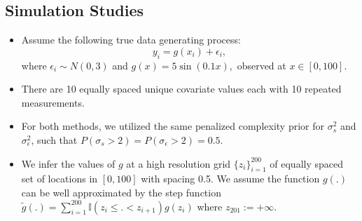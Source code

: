\documentclass{beamer} %
\begin{document}
\subsection{Simulation Studies}
\begin{frame}

\begin{itemize}
\item Assume the following true data generating process:
$$y_i = g(x_i) + \epsilon_i, $$
where $\epsilon_i \sim N(0,3)$ and $g(x) = 5\sin(0.1x),$ observed at $x \in [0,100]$.


\pause
\item There are 10 equally spaced unique covariate values each with 10 repeated measurements. 

\pause
\item For both methods, we utilized the same penalized complexity prior \citep{simpson2017penalising} for $\sigma_s^2$ and $\sigma_\epsilon^2$, such that $P(\sigma_s > 2) = P(\sigma_\epsilon > 2) = 0.5$. 

\pause
\item We infer the values of $g$ at a high resolution grid $\{z_i\}_{i=1}^{200}$ of equally spaced set of locations in $[0,100]$ with spacing 0.5. We assume the function $g(.)$ can be well approximated by the step function $\tilde{g}(.) = \sum_{i=1}^{200} \mathbb{I}(z_{i}\leq.< z_{i+1})g(z_i)$ where $z_{201} := +\infty$.

\end{itemize}


\end{frame}
\end{document}
